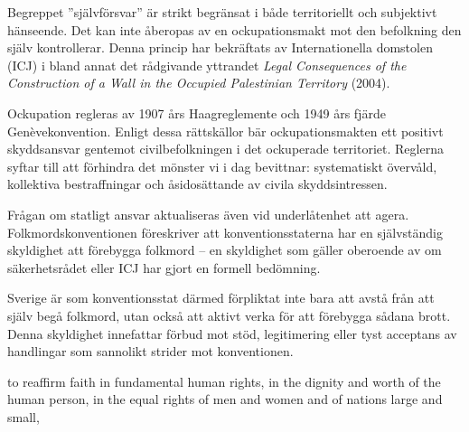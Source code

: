 Begreppet ”självförsvar” är strikt begränsat i både territoriellt och subjektivt hänseende. Det kan inte åberopas av en ockupationsmakt mot den befolkning den själv kontrollerar. Denna princip har bekräftats av Internationella domstolen (ICJ) i bland annat det rådgivande yttrandet \textit{Legal Consequences of the Construction of a Wall in the Occupied Palestinian Territory} (2004).

\medskip

Ockupation regleras av 1907 års Haagreglemente och 1949 års fjärde Genèvekonvention. 
Enligt dessa rättskällor bär ockupationsmakten ett positivt skyddsansvar gentemot civilbefolkningen i 
det ockuperade territoriet. Reglerna syftar till att förhindra det mönster vi i dag bevittnar: 
systematiskt övervåld, kollektiva bestraffningar och åsidosättande av civila skyddsintressen.



\medskip

Frågan om statligt ansvar aktualiseras även vid underlåtenhet att agera. 
Folkmordskonventionen föreskriver att konventionsstaterna har en självständig skyldighet 
att förebygga folkmord – en skyldighet som gäller oberoende av om säkerhetsrådet 
eller ICJ har gjort en formell bedömning.

Sverige är som konventionsstat därmed förpliktat inte bara att avstå från att själv begå folkmord, 
utan också att aktivt verka för att förebygga sådana brott. Denna skyldighet innefattar förbud mot stöd, 
legitimering eller tyst acceptans av handlingar som sannolikt strider mot konventionen.

\medskip
to reaffirm faith in fundamental human rights, in the dignity and worth of the human person, in the equal rights of men and women and of nations large and small,

